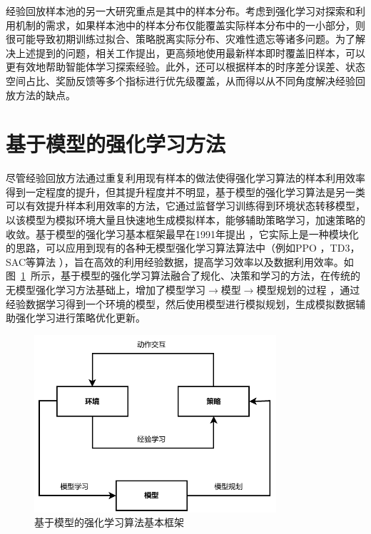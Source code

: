 经验回放样本池的另一大研究重点是其中的样本分布。考虑到强化学习对探索和利用机制的需求，如果样本池中的样本分布仅能覆盖实际样本分布中的一小部分，则很可能导致初期训练过拟合、策略脱离实际分布、灾难性遗忘等诸多问题。为了解决上述提到的问题，相关工作提出，更高频地使用最新样本即时覆盖旧样本，可以更有效地帮助智能体学习探索经验\cite{de2015importance}。此外，还可以根据样本的时序差分误差、状态空间占比、奖励反馈等多个指标进行优先级覆盖，从而得以从不同角度解决经验回放方法的缺点。

\section{基于模型的强化学习方法}

尽管经验回放方法通过重复利用现有样本的做法使得强化学习算法的样本利用效率得到一定程度的提升，但其提升程度并不明显，基于模型的强化学习算法是另一类可以有效提升样本利用效率的方法，它通过监督学习训练得到环境状态转移模型，以该模型为模拟环境大量且快速地生成模拟样本，能够辅助策略学习，加速策略的收敛。基于模型的强化学习基本框架最早在1991年提出 \cite{Sutton1991DynaReacting}，它实际上是一种模块化的思路，可以应用到现有的各种无模型强化学习算法算法中（例如PPO ，TD3，SAC等算法 \cite{schulman2017proximal,haarnoja2018soft}），旨在高效的利用经验数据，提高学习效率以及数据利用效率。如图~\ref{fig:dyna-structure}~所示，基于模型的强化学习算法融合了规化、决策和学习的方法，在传统的无模型强化学习方法基础上，增加了模型学习$\longrightarrow$模型$\longrightarrow$模型规划的过程 \cite{lin1992self}，通过经验数据学习得到一个环境的模型，然后使用模型进行模拟规划，生成模拟数据辅助强化学习进行策略优化更新。

\begin{figure}[tbh]
\centering
\includegraphics[width=0.8\textwidth]{figures/MBRL-struc.pdf}
\caption{基于模型的强化学习算法基本框架}
\label{fig:dyna-structure}
\end{figure}

